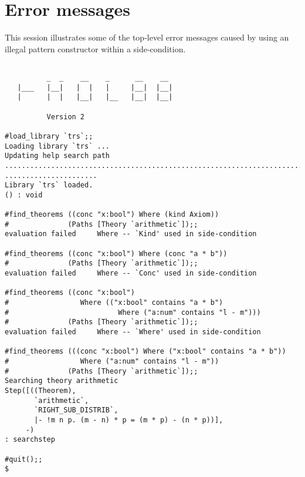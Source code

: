 \section{Error messages}

This session illustrates some of the top-level error messages caused by using
an illegal pattern constructor within a side-condition.

\setcounter{sessioncount}{1}

\begin{session}\begin{verbatim}

          _  _    __    _      __    __
   |___   |__|   |  |   |     |__|  |__|
   |      |  |   |__|   |__   |__|  |__|
   
          Version 2

#load_library `trs`;;
Loading library `trs` ...
Updating help search path
.............................................................................
......................
Library `trs` loaded.
() : void

#find_theorems ((conc "x:bool") Where (kind Axiom))
#              (Paths [Theory `arithmetic`]);;
evaluation failed     Where -- `Kind' used in side-condition

#find_theorems ((conc "x:bool") Where (conc "a * b"))
#              (Paths [Theory `arithmetic`]);;
evaluation failed     Where -- `Conc' used in side-condition

#find_theorems ((conc "x:bool")
#                 Where (("x:bool" contains "a * b")
#                          Where ("a:num" contains "l - m")))
#              (Paths [Theory `arithmetic`]);;
evaluation failed     Where -- `Where' used in side-condition

#find_theorems (((conc "x:bool") Where ("x:bool" contains "a * b"))
#                 Where ("a:num" contains "l - m"))
#              (Paths [Theory `arithmetic`]);;
Searching theory arithmetic
Step([((Theorem),
       `arithmetic`,
       `RIGHT_SUB_DISTRIB`,
       |- !m n p. (m - n) * p = (m * p) - (n * p))],
     -)
: searchstep

#quit();;
$
\end{verbatim}\end{session}

